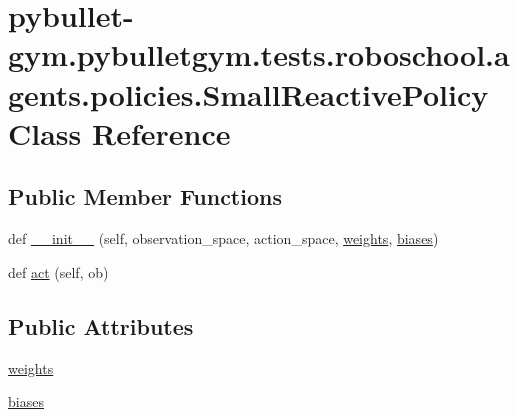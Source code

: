 \hypertarget{classpybullet-gym_1_1pybulletgym_1_1tests_1_1roboschool_1_1agents_1_1policies_1_1_small_reactive_policy}{}\section{pybullet-\/gym.pybulletgym.\+tests.\+roboschool.\+agents.\+policies.\+Small\+Reactive\+Policy Class Reference}
\label{classpybullet-gym_1_1pybulletgym_1_1tests_1_1roboschool_1_1agents_1_1policies_1_1_small_reactive_policy}
\subsection*{Public Member Functions}
\begin{DoxyCompactItemize}
\item 
def \hyperlink{classpybullet-gym_1_1pybulletgym_1_1tests_1_1roboschool_1_1agents_1_1policies_1_1_small_reactive_policy_a61968781d3acf72127b37fc671cce85c}{\+\_\+\+\_\+init\+\_\+\+\_\+} (self, observation\+\_\+space, action\+\_\+space, \hyperlink{classpybullet-gym_1_1pybulletgym_1_1tests_1_1roboschool_1_1agents_1_1policies_1_1_small_reactive_policy_a5960d953ee07f9974eae87d16291576a}{weights}, \hyperlink{classpybullet-gym_1_1pybulletgym_1_1tests_1_1roboschool_1_1agents_1_1policies_1_1_small_reactive_policy_a55429fbc03166e965f626f73b49f93f1}{biases})
\item 
def \hyperlink{classpybullet-gym_1_1pybulletgym_1_1tests_1_1roboschool_1_1agents_1_1policies_1_1_small_reactive_policy_a3e48a23a61de9dc6e6694cf30fea3673}{act} (self, ob)
\end{DoxyCompactItemize}
\subsection*{Public Attributes}
\begin{DoxyCompactItemize}
\item 
\hyperlink{classpybullet-gym_1_1pybulletgym_1_1tests_1_1roboschool_1_1agents_1_1policies_1_1_small_reactive_policy_a5960d953ee07f9974eae87d16291576a}{weights}
\item 
\hyperlink{classpybullet-gym_1_1pybulletgym_1_1tests_1_1roboschool_1_1agents_1_1policies_1_1_small_reactive_policy_a55429fbc03166e965f626f73b49f93f1}{biases}
\end{DoxyCompactItemize}


